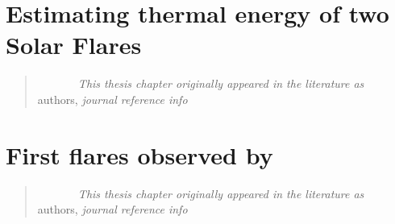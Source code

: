 \documentclass[plain]{hvdthesis}
\begin{document}
\chapter{Estimating thermal energy of two Solar Flares}\label{c:chap6}
\begin{quote}
{\em ~~~~~~~This thesis chapter originally appeared in the literature as} \\
{authors,
{\em journal reference info}}
\end{quote}

\clearpage
%
\chapter{First flares observed by {\suit}}\label{c:chap7}
\begin{quote}
{\em ~~~~~~~This thesis chapter originally appeared in the literature as} \\
{authors,
{\em journal reference info}}
\end{quote}

\clearpage
%

\singlespace


\end{document}
